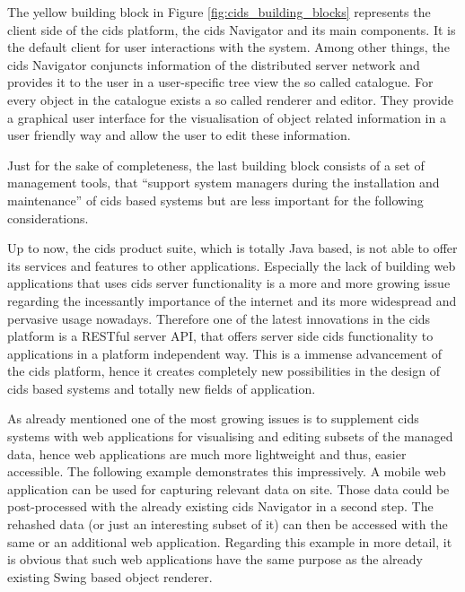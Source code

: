  
The yellow building block in Figure \ref{fig:cids_building_blocks} represents the client side of the cids platform, the cids Navigator and its main components.
It is the default client for user interactions with the system.
Among other things, the cids Navigator conjuncts information of the distributed server network and provides it to the user in a user-specific tree view the so called catalogue.
For every object in the catalogue exists a so called renderer and editor.
They provide a graphical user interface for the visualisation of object related information in a user friendly way and allow the user to edit these information.


Just for the sake of completeness, the last building block consists of a set of management tools, that ``support system managers during the installation and maintenance'' \autocite[]{cismet-cids-readMe} of cids based systems but are less important for the following considerations.

Up to now, the cids product suite, which is totally Java based, is not able to offer its services and features to other applications.
Especially the lack of building web applications that uses cids server functionality is a more and more growing issue regarding the incessantly importance of the internet and its more widespread and pervasive usage nowadays.
Therefore one of the latest innovations in the cids platform is a RESTful server API, that offers server side cids functionality to applications in a platform independent way.
This is a immense advancement of the cids platform, hence it creates completely new possibilities in the design of cids based systems and totally new fields of application.


As already mentioned one of the most growing issues is to supplement cids systems with web applications for visualising and editing subsets of the managed data, hence web applications are much more lightweight and thus, easier accessible.
The following example demonstrates this impressively.
A mobile web application can be used for capturing relevant data on site.
Those data could be post-processed with the already existing cids Navigator in a second step.
The rehashed data (or just an interesting subset of it) can then be accessed with the same or an additional web application.
Regarding this example in more detail, it is obvious that such web applications have the same purpose as the already existing Swing based object renderer.


